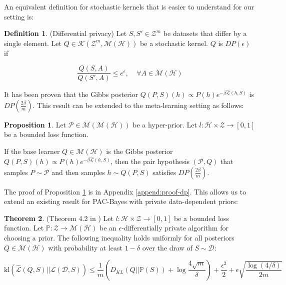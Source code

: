 \documentclass{article}
\theoremstyle{definition}
\newtheorem{defn}{Definition}[section]
\newtheorem{theorem}{Theorem}[section]
\newtheorem{proposition}[theorem]{Proposition}
\begin{document}
An equivalent definition for stochastic kernels that is easier to understand for our setting is:

\begin{defn} (Differential privacy)
	Let $S,S'\in \mathcal{Z}^m$ be datasets that differ by a single element.
	Let $Q\in \mathcal{K}(\mathcal{Z}^m, \mathcal{M}(\mathcal{H}))$ be a stochastic kernel.
	$Q$ is $DP(\epsilon)$ if 
	
	$$\frac{Q(S, A)}{Q(S', A)} \leq e^\epsilon, \;\;\;\; \forall A\in  \mathcal{M}(\mathcal{H})$$
\end{defn}

It has been proven \citep{McSherry2007, Rivasplata2020} that the Gibbs posterior $Q(P, S)(h)\propto P(h)e^{-\beta\hat{\mathcal{L}}(h, S)}$ is $DP\left (\frac{2\beta}{m}\right )$.
This result can be extended to the meta-learning setting as follows:

\begin{proposition} \label{thm:pair-is-dp}
	Let $\mathcal{P}\in \mathcal{M}(\mathcal{M}(\mathcal{H}))$ be a hyper-prior.
	Let $l:\mathcal{H}\times \mathcal{Z}\rightarrow [0,1]$ be a bounded loss function.
	
	If the base learner $Q\in \mathcal{M}(\mathcal{H})$ is the Gibbs posterior $Q(P, S)(h)\propto P(h)e^{-\beta\hat{\mathcal{L}}(h, S)}$, 
	then the pair hypothesis $(\mathcal{P}, Q)$ that samples $P\sim\mathcal{P}$ and then samples $h\sim Q(P, S)$ satisfies $DP\left (\frac{2\beta}{m}\right )$.
\end{proposition}

The proof of Proposition \ref{thm:pair-is-dp} is in Appendix \ref{append:proof-dp}. This  allows us to extend an existing result for PAC-Bayes with private data-dependent priors:

\begin{theorem} \label{thm:dzugaite-kl} (Theorem 4.2 in \citet{Dziugaite2018})
	Let $l:\mathcal{H}\times \mathcal{Z}\rightarrow [0,1]$ be a bounded loss function.
	Let $\mathbb{P}:\mathcal{Z}\rightarrow \mathcal{M}(\mathcal{H})$ be an $\epsilon$-differentially private algorithm for choosing a prior.
	The following inequality holds uniformly for all posteriors $Q\in \mathcal{M}(\mathcal{H})$ with probability at least $1-\delta$ over the draw of $S\sim \mathcal{D}$:
	
	$$\mathrm{kl}(\hat{\mathcal{L}}(Q,S)||\mathcal{L}(\mathcal{D},S))\leq \frac{1}{m}\left (D_{KL}(Q||\mathbb{P}(S))+\log\frac{4\sqrt{m}}{\delta} \right ) +\frac{\epsilon^2}{2}+\epsilon\sqrt{\frac{\log (4/\delta)}{2m}} $$

\end{theorem}
\end{document}
